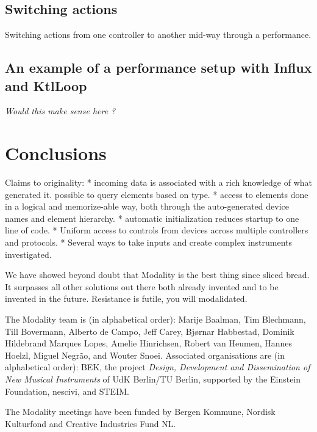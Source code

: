 \documentclass{article}
\begin{document}
\subsection{Switching actions}
\label{sub:switching_actions}

Switching actions from one controller to another mid-way through a performance.

\subsection{An example of a performance setup with Influx and KtlLoop}

\emph{Would this make sense here ?}




\section{Conclusions}
\label{sec:conclusions}


Claims to originality:
* incoming data is associated with a rich knowledge of what generated it. possible to query elements based on type.
* access to elements done in a logical and memorize-able way, both through the auto-generated device names and element hierarchy.
* automatic initialization reduces startup to one line of code.
* Uniform access to controls from devices across multiple controllers and protocols.
* Several ways to take inputs and create complex instruments investigated.

We have showed beyond doubt that Modality is the best thing since sliced bread. It surpasses all other solutions out there both already invented and to be invented in the future. Resistance is futile, you will modalidated.


\begin{acknowledgments}
The Modality team is (in alphabetical order):
    Marije Baalman,
    Tim Blechmann,
    Till Bovermann,
    Alberto de Campo,
    Jeff Carey,
    Bj\o{}rnar Habbestad,
    Dominik Hildebrand Marques Lopes,
    Amelie Hinrichsen,
    Robert van Heumen,
    Hannes Hoelzl,
    Miguel Negr\~{a}o, and
    Wouter Snoei.
Associated organisations are (in alphabetical order):
BEK,
the project \emph{Design, Development and Dissemination of New Musical Instruments} of UdK Berlin/TU Berlin, supported by the Einstein Foundation,
nescivi, and
STEIM.

The Modality meetings have been funded by Bergen Kommune, Nordisk Kulturfond and Creative Industries Fund NL.


\end{acknowledgments} 


\end{document}
